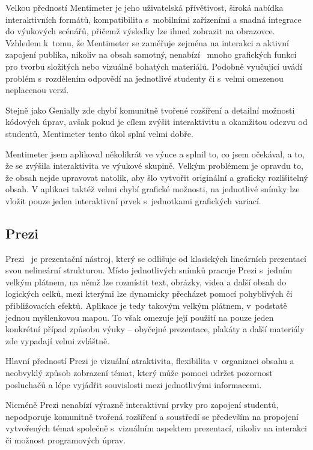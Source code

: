 Velkou předností Mentimeter je jeho uživatelská přívětivost, široká nabídka interaktivních formátů, kompatibilita s~mobilními zařízeními a snadná integrace do výukových scénářů, přičemž výsledky lze ihned zobrazit na obrazovce. 
Vzhledem k~tomu, že Mentimeter se zaměřuje zejména na interakci a aktivní zapojení publika, nikoliv na obsah samotný, nenabízí~\cite{mentimeter_review} mnoho grafických funkcí pro tvorbu složitých nebo vizuálně bohatých materiálů. 
Podobně vyučující uvádí problém s~rozdělením odpovědí na jednotlivé studenty či s~velmi omezenou neplacenou verzí.

Stejně jako Genially zde chybí komunitně tvořené rozšíření a detailní možnosti kódových úprav, avšak pokud je cílem zvýšit interaktivitu a okamžitou odezvu od studentů, Mentimeter tento úkol splní velmi dobře.

Mentimeter jsem aplikoval několikrát ve výuce a splnil to, co jsem očekával, a to, že se zvýšila interaktivita ve výukové skupině. 
Velkým problémem je opravdu to, že obsah nejde upravovat natolik, aby šlo vytvořit originální a graficky rozlišitelný obsah. 
V aplikaci taktéž velmi chybí grafické možnosti, na jednotlivé snímky lze vložit pouze jeden interaktivní prvek s~jednotkami grafických variací.

\subsection{Prezi}

Prezi~\cite{prezi} je prezentační nástroj, který se odlišuje od klasických lineárních prezentací svou nelineární strukturou.
Místo jednotlivých snímků pracuje Prezi s~jedním velkým plátnem, na němž lze rozmístit text, obrázky, videa a další obsah do logických celků, mezi kterými lze dynamicky přecházet pomocí pohyblivých či přibližovacích efektů.
Aplikace je tedy takovým velkým plátnem, v~podstatě jednou myšlenkovou mapou.
To však omezuje její použití na pouze jeden konkrétní případ způsobu výuky -- obyčejné prezentace, plakáty a další materiály zde vypadají velmi zvláštně.

Hlavní předností Prezi je vizuální atraktivita, flexibilita v~organizaci obsahu a neobvyklý způsob zobrazení témat, který může pomoci udržet pozornost posluchačů a lépe vyjádřit souvislosti mezi jednotlivými informacemi. 

Nicméně Prezi nenabízí výrazně interaktivní prvky pro zapojení studentů, nepodporuje komunitně tvořená rozšíření a soustředí se především na propojení vytvořených témat společně s~vizuálním aspektem prezentací, nikoliv na interakci či možnost programových úprav.

